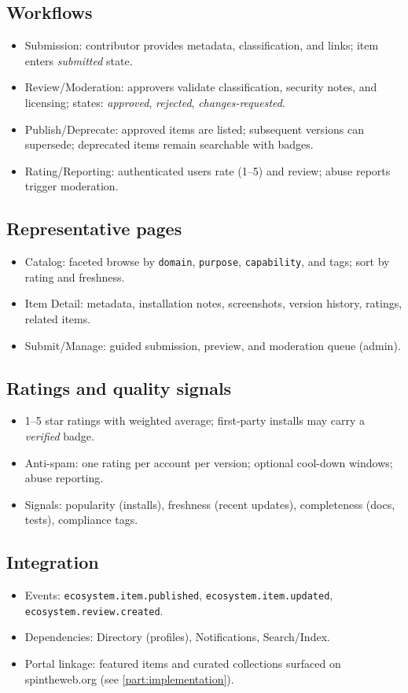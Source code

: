 \subsection{Workflows}
\begin{itemize}
  \item Submission: contributor provides metadata, classification, and links; item enters \emph{submitted} state.
  \item Review/Moderation: approvers validate classification, security notes, and licensing; states: \emph{approved}, \emph{rejected}, \emph{changes-requested}.
  \item Publish/Deprecate: approved items are listed; subsequent versions can supersede; deprecated items remain searchable with badges.
  \item Rating/Reporting: authenticated users rate (1--5) and review; abuse reports trigger moderation.
\end{itemize}

\subsection{Representative pages}
\begin{itemize}
  \item Catalog: faceted browse by \texttt{domain}, \texttt{purpose}, \texttt{capability}, and tags; sort by rating and freshness.
  \item Item Detail: metadata, installation notes, screenshots, version history, ratings, related items.
  \item Submit/Manage: guided submission, preview, and moderation queue (admin).
\end{itemize}

\subsection{Ratings and quality signals}
\begin{itemize}
  \item 1--5 star ratings with weighted average; first-party installs may carry a \emph{verified} badge.
  \item Anti-spam: one rating per account per version; optional cool-down windows; abuse reporting.
  \item Signals: popularity (installs), freshness (recent updates), completeness (docs, tests), compliance tags.
\end{itemize}

\subsection{Integration}
\begin{itemize}
  \item Events: \texttt{ecosystem.item.published}, \texttt{ecosystem.item.updated}, \texttt{ecosystem.review.created}.
  \item Dependencies: Directory (profiles), Notifications, Search/Index.
  \item Portal linkage: featured items and curated collections surfaced on spintheweb.org (see \cref{part:implementation}).
\end{itemize}

